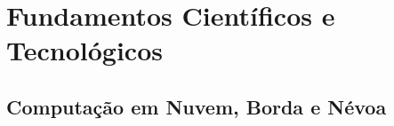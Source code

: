 \chapter{Fundamentos Científicos e Tecnológicos}\label{cha:fundamentos}


\section{Computação em Nuvem, Borda e Névoa}






